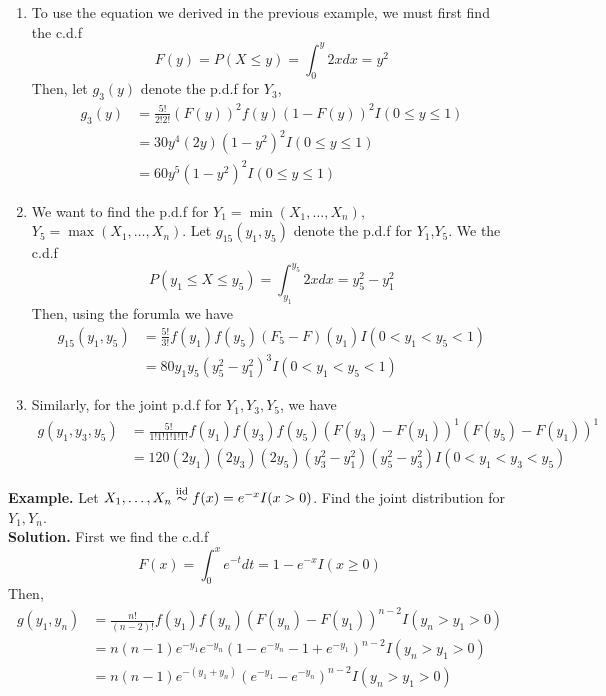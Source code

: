 \documentclass[openany]{report}
\begin{document}
     \begin{enumerate}[label=(\roman*)]
        \item To use the equation we derived in the previous example, we must first find the c.d.f 
        \[F(y) = P(X \leq y) = \int_0^y 2xdx = y^2\]
        Then, let $g_3(y)$ denote the p.d.f for $Y_3$,
        \begin{align*}
            g_3(y) &= \frac{5!}{2!2!} (F(y))^2f(y)(1 - F(y))^2I(0 \leq y \leq 1)\\
            &= 30y^4(2y)(1-y^2)^2I(0 \leq y \leq 1)\\
            &= 60y^5(1-y^2)^2I(0 \leq y \leq 1)
        \end{align*}
        \item We want to find the p.d.f for $Y_1 = \min(X_1, \ldots, X_n)$, $Y_5 = \max(X_1,\ldots, X_n)$. Let $g_{15}(y_1,y_5)$ denote the p.d.f for $Y_1$,$Y_5$. 
        We the c.d.f 
        \[P(y_1 \leq X \leq y_5) = \int_{y_1}^{y_5} 2xdx = y_5^2 - y_1^2\]
        Then, using the forumla we have 
        \begin{align*}
            g_{15}(y_1,y_5) &= \frac{5!}{3!} f(y_1)f(y_5)(F_5 - F)(y_1)I(0 < y_1 < y_5 < 1)\\
            &= 80y_1y_5(y_5^2 - y_1^2)^3I(0 < y_1 < y_5 < 1)  
        \end{align*}
        \item Similarly, for the joint p.d.f for $Y_1,Y_3,Y_5$, we have 
        \begin{align*}
            g(y_1,y_3,y_5) &= \frac{5!}{1!1!1!1!1!}f(y_1)f(y_3)f(y_5)(F(y_3) - F(y_1))^1(F(y_5) - F(y_1))^1\\
            &= 120(2y_1)(2y_3)(2y_5)(y_3^2 - y_1^2)(y_5^2 - y_3^2)I(0 < y_1 < y_3 < y_5)
        \end{align*}
    \end{enumerate}
    \textbf{Example.} Let $X_1, \ldots, X_n \overset{\mathrm{iid}}{\sim} f(x) = e^{-x}I(x > 0)$. Find the joint distribution for $Y_1, Y_n$. \\[2ex]
    \textbf{Solution.} First we find the c.d.f 
    \[F(x) = \int_0^x e^{-t}dt = 1 - e^{-x}I(x \geq 0)\]
    Then, 
    \begin{align*}
        g(y_1, y_n) &= \frac{n!}{(n-2)!}f(y_1)f(y_n)(F(y_n) - F(y_1))^{n-2}I( y_n > y_1 > 0)\\
        &= n(n-1)e^{-y_1}e^{-y_n}(1-e^{-y_n} - 1 + e^{-y_1})^{n-2}I( y_n > y_1 > 0)\\
        &= n(n-1)e^{-(y_1+y_n)}(e^{-y_1} - e^{-y_n})^{n-2}I(y_n > y_1 > 0)
    \end{align*}
\end{document}
